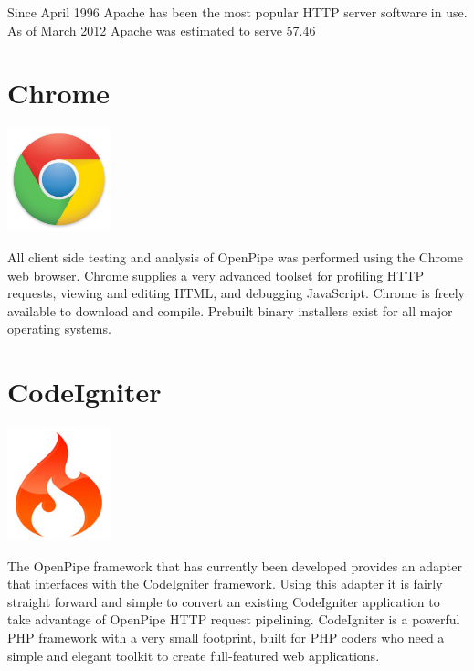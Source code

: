 \documentclass[12pt]{report}
\begin{document}
Since April 1996 Apache has been the most popular HTTP server software in use. As of March 2012 Apache was estimated to serve 57.46%


\section{Chrome}
\begin{center} 
\includegraphics[width=30mm]{figures/images/chrome_logo.jpg}
\end{center}

All client side testing and analysis of OpenPipe was performed using the Chrome web browser. Chrome supplies a very advanced toolset for profiling HTTP requests, viewing and editing HTML, and debugging JavaScript. Chrome is freely available to download and compile. Prebuilt binary installers exist for all major operating systems. 
 

\section{CodeIgniter}
\begin{center}
\includegraphics[width=30mm]{figures/images/ci_logo.jpg}
\end{center}

The OpenPipe framework that has currently been developed provides an adapter that interfaces with the CodeIgniter framework. Using this adapter it is fairly straight forward and simple to convert an existing CodeIgniter application to take advantage of OpenPipe HTTP request pipelining. CodeIgniter is a powerful PHP framework with a very small footprint, built for PHP coders who need a simple and elegant toolkit to create full-featured web applications. 
\end{document}
